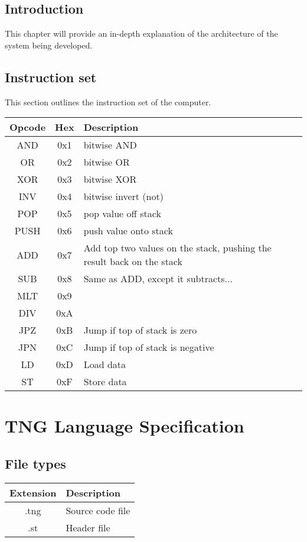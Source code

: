 \documentclass{book}
\begin{document}
\section{Introduction}
This chapter will provide an in-depth explanation of the architecture of the
system being developed.

\section{Instruction set}
This section outlines the instruction set of the computer. \\
\begin{tabular}{|c|c|l|}
  \hline
  \textbf{Opcode} & \textbf{Hex} & \textbf{Description} \\
  \hline
  AND & 0x1 & bitwise AND \\
  OR & 0x2 & bitwise OR \\
  XOR & 0x3 & bitwise XOR \\
  INV & 0x4 & bitwise invert (not) \\
  POP & 0x5 & pop value off stack \\
  PUSH & 0x6 & push value onto stack \\
  ADD & 0x7 & Add top two values on the stack, pushing the result back on the stack \\
  SUB & 0x8 & Same as ADD, except it subtracts... \\
  MLT & 0x9 & \\
  DIV & 0xA & \\
  JPZ & 0xB & Jump if top of stack is zero \\
  JPN & 0xC & Jump if top of stack is negative \\
  LD & 0xD & Load data \\
  ST & 0xF & Store data \\
\end{tabular}

\chapter{TNG Language Specification}
\section{File types}
\begin{tabular}{|c|l|}
  \hline
  \textbf{Extension} & \textbf{Description} \\
  \hline
  .tng & Source code file \\
  .st  & Header file \\
  \hline
\end{tabular}
\end{document}
